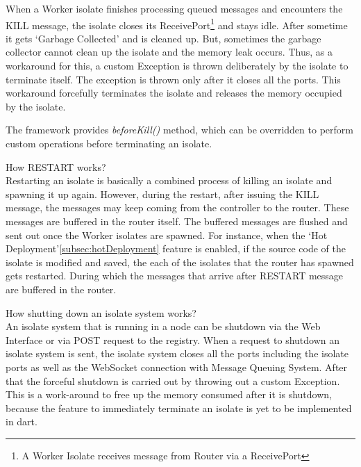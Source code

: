 \begin{description}
    When a Worker isolate finishes processing queued messages and encounters the KILL message, the isolate closes its ReceivePort\footnote{A Worker Isolate receives message from Router via a ReceivePort} and stays idle. After sometime it gets ‘Garbage Collected’ and is cleaned up. But, sometimes the garbage collector cannot clean up the isolate and the memory leak occurs. Thus, as a workaround for this, a custom Exception is thrown deliberately by the isolate to terminate itself. The exception is thrown only after it closes all the ports. This workaround forcefully terminates the isolate and releases the memory occupied by the isolate.

    The framework provides \emph{beforeKill()} method, which can be overridden to perform custom operations before terminating an isolate.

    \item How RESTART works?\\
    Restarting an isolate is basically a combined process of killing an isolate and spawning it up again. However, during the restart, after issuing the KILL message, the messages may keep coming from the controller to the router. These messages are buffered in the router itself. The buffered messages are flushed and sent out once the Worker isolates are spawned. For instance, when the ‘Hot Deployment’\autoref{subsec:hotDeployment} feature is enabled, if the source code of the isolate is modified and saved, the each of the isolates that the router has spawned gets restarted. During which the messages that arrive after RESTART message are buffered in the router.

    \item How shutting down an isolate system works?\\
    An isolate system that is running in a node can be shutdown via the Web Interface or via POST request to the registry. When a request to shutdown an isolate system is sent, the isolate system closes all the ports including the isolate ports as well as the WebSocket connection with Message Queuing System. After that the forceful shutdown is carried out by throwing out a custom Exception. This is a work-around to free up the memory consumed after it is shutdown, because the feature to immediately terminate an isolate is yet to be implemented in dart.
  \end{description}

